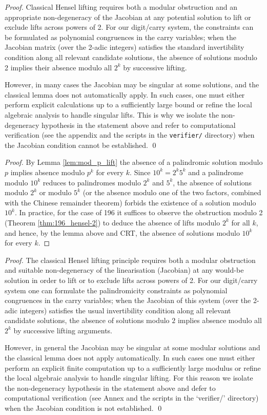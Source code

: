 \documentclass[12pt,a4paper]{article}
\begin{document}
\begin{proof}
Classical Hensel lifting requires both a modular obstruction and an appropriate non-degeneracy of the Jacobian at any potential solution to lift or exclude lifts across powers of 2. For our digit/carry system, the constraints can be formulated as polynomial congruences in the carry variables; when the Jacobian matrix (over the 2-adic integers) satisfies the standard invertibility condition along all relevant candidate solutions, the absence of solutions modulo 2 implies their absence modulo all $2^k$ by successive lifting.

However, in many cases the Jacobian may be singular at some solutions, and the classical lemma does not automatically apply. In such cases, one must either perform explicit calculations up to a sufficiently large bound or refine the local algebraic analysis to handle singular lifts. This is why we isolate the non-degeneracy hypothesis in the statement above and refer to computational verification (see the appendix and the scripts in the \texttt{verifier/} directory) when the Jacobian condition cannot be established.
\qed
\end{proof}


\begin{proof}
By Lemma \ref{lem:mod_p_lift} the absence of a palindromic solution modulo $p$ implies absence modulo $p^k$ for every $k$. Since $10^k=2^k5^k$ and a palindrome modulo $10^k$ reduces to palindromes modulo $2^k$ and $5^k$, the absence of solutions modulo $2^k$ or modulo $5^k$ (or the absence modulo one of the two factors, combined with the Chinese remainder theorem) forbids the existence of a solution modulo $10^k$. In practice, for the case of 196 it suffices to observe the obstruction modulo 2 (Theorem \ref{thm:196_hensel-2}) to deduce the absence of lifts modulo $2^k$ for all $k$, and hence, by the lemma above and CRT, the absence of solutions modulo $10^k$ for every $k$.
\end{proof}

\begin{proof}
The classical Hensel lifting principle requires both a modular obstruction and suitable non-degeneracy of the linearisation (Jacobian) at any would-be solution in order to lift or to exclude lifts across powers of 2. For our digit/carry system one can formulate the palindromicity constraints as polynomial congruences in the carry variables; when the Jacobian of this system (over the 2-adic integers) satisfies the usual invertibility condition along all relevant candidate solutions, the absence of solutions modulo $2$ implies absence modulo all $2^k$ by successive lifting arguments.

However, in general the Jacobian may be singular at some modular solutions and the classical lemma does not apply automatically. In such cases one must either perform an explicit finite computation up to a sufficiently large modulus or refine the local algebraic analysis to handle singular lifting. For this reason we isolate the non-degeneracy hypothesis in the statement above and defer to computational verification (see Annex and the scripts in the `verifier/' directory) when the Jacobian condition is not established.
\qed
\end{proof}
\end{document}

